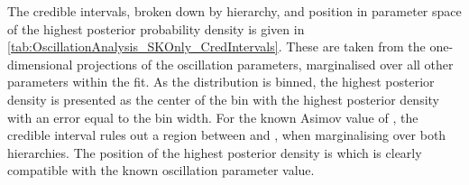 The \quickmath{1\sigma} credible intervals, broken down by hierarchy, and position in parameter space of the highest posterior probability density is given in \autoref{tab:OscillationAnalysis_SKOnly_CredIntervals}. These are taken from the one-dimensional projections of the oscillation parameters, marginalised over all other parameters within the fit. As the distribution is binned, the highest posterior density is presented as the center of the bin with the highest posterior density with an error equal to the bin width. For the known Asimov value of , the \quickmath{1\sigma} credible interval rules out a region between  and , when marginalising over both hierarchies. The position of the highest posterior density is  which is clearly compatible with the known oscillation parameter value.


